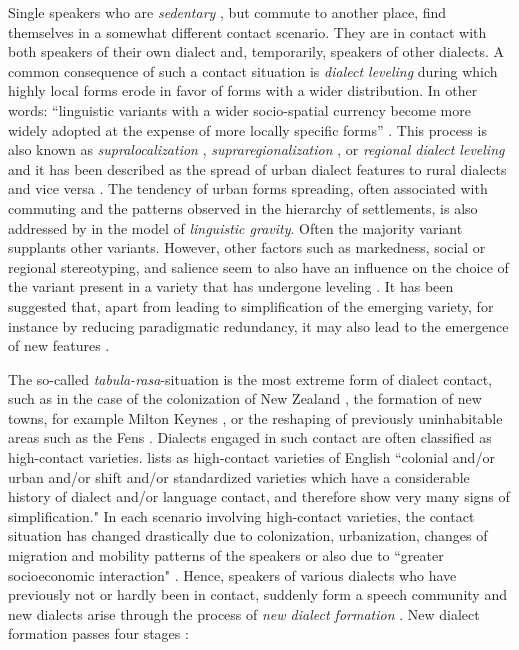 \documentclass[output=paper]{langscibook}
\begin{document}
Single speakers who are \textit{sedentary} \parencite[cf.][]{Britain2016Sedentarism}, but commute to another place, find themselves in a somewhat different contact scenario. They are in contact with both speakers of their own dialect and, temporarily, speakers of other dialects. 
A common consequence of such a contact situation is \textit{dialect leveling} during which highly local forms erode in favor of forms with a wider distribution. In other words: “linguistic variants with a wider socio-spatial currency become more widely adopted at the expense of more locally specific forms” \parencite[][193]{Britain.2010}. This process is also known as \textit{supralocalization} \parencite[][8-10]{Milroy.2002}, \textit{supraregionalization} \parencite{Hickey.2003}, or \textit{regional dialect leveling} \parencite[]{Kerswill2003} and it has been described as the spread of urban dialect features to rural dialects \parencite[]{BritainTrudgill.2005} and vice versa \parencite[]{Britain2010LangAndSpace}. The tendency of urban forms spreading, often associated with commuting and the patterns observed in the hierarchy of  settlements, is also addressed by \textcite{Trudgill1974} in the model of \textit{linguistic gravity}. Often the majority variant supplants other variants. However, other factors such as markedness, social or regional stereotyping, and salience seem to also have an influence on the choice of the variant present in a variety that has undergone leveling \parencite[195]{Britain.2010}. It has been suggested that, apart from leading to simplification of the emerging variety, for instance by reducing paradigmatic redundancy, it may also lead to the emergence of new features \parencite[13]{Williams.1999}.

The so-called \textit{tabula-rasa}-situation is the most extreme form of dialect contact, such as in the case of the colonization of New Zealand \parencite[]{Trudgill.2004}, the formation of new towns, for example Milton Keynes \parencite[]{Williams.1999}, or the reshaping of previously uninhabitable areas such as the Fens \parencite[]{Britain.1997}. Dialects engaged in such contact are often classified as high-contact varieties. \textcite[66-67]{Trudgill.2004} lists as high-contact varieties of English “colonial and/or urban and/or shift and/or standardized varieties which have a considerable history of dialect and/or language contact, and therefore show very many signs of simplification." In each scenario involving high-contact varieties, the contact situation has changed drastically due to colonization, urbanization, changes of migration and mobility patterns of the speakers or also due to “greater socioeconomic interaction" \parencite[][192]{Croft.2000}. Hence, speakers of various dialects who have previously not or hardly been in contact, suddenly form a speech community and new dialects arise through the process of \textit{new dialect formation} \parencite[]{Britain.2009,Kerswill.2010,Schreier.2017}. New dialect formation passes four stages \parencite[]{Trudgill1986}: 
\end{document}
